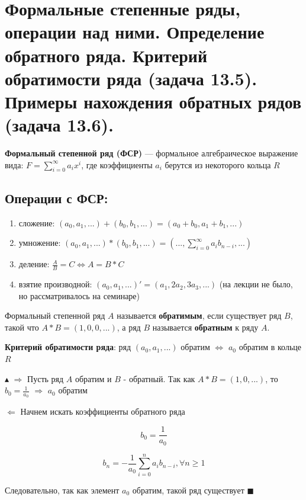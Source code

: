 \setcounter{section}{53}

\section{Формальные степенные ряды, операции над ними. Определение обратного ряда. Критерий обратимости ряда (задача 13.5). Примеры нахождения обратных рядов (задача 13.6).}
\textbf{Формальный степенной ряд (ФСР)} — формальное алгебраическое выражение вида: $F=\sum_{i=0}^{\infty} a_{i}x^i$, где коэффициенты $a_i$ берутся из некоторого кольца $R$

\subsection*{Операции с ФСР:}
\begin{enumerate}
    \item сложение: $(a_0, a_1, ...)+(b_0, b_1, ...)=(a_0+b_0, a_1+b_1, ...)$
    \item умножение: \((a_0, a_1, ...)*(b_0, b_1, ...)=(..., \sum_{i=0}^{\infty} a_i b_{n-i}, ...)\)
    \item деление: $\frac{A}{B} = C \Leftrightarrow A=B*C$
    \item взятие производной: $(a_0, a_1, ...)'=(a_1, 2a_2, 3a_3, ...)$ (на лекции не было, но рассматривалось на семинаре)
\end{enumerate}

Формальный степенной ряд $A$ называется \textbf{обратимым}, если существует ряд $B$, такой что $A*B=(1, 0, 0, ...)$, а ряд $B$ называется \textbf{обратным} к ряду $A$.

\textbf{Критерий обратимости ряда}: ряд $(a_0, a_1, ...)$ обратим $\Leftrightarrow$  $a_0$ обратим в кольце $R$

$\blacktriangle$ $\Rightarrow$ Пусть ряд $A$ обратим и $B$ - обратный. Так как $A*B=(1, 0, ...)$, то $b_0 = \frac{1}{a_0}$ $\Rightarrow$ $a_0$ обратим

$\Leftarrow$ Начнем искать коэффициенты обратного ряда

\[b_0 = \frac{1}{a_0}\]

\[b_n = -\frac{1}{a_0} \sum_{i=0}^{n} a_i b_{n-i}, \forall n \geq 1\]

Следовательно, так как элемент $a_0$ обратим, такой ряд существует $\blacksquare$
